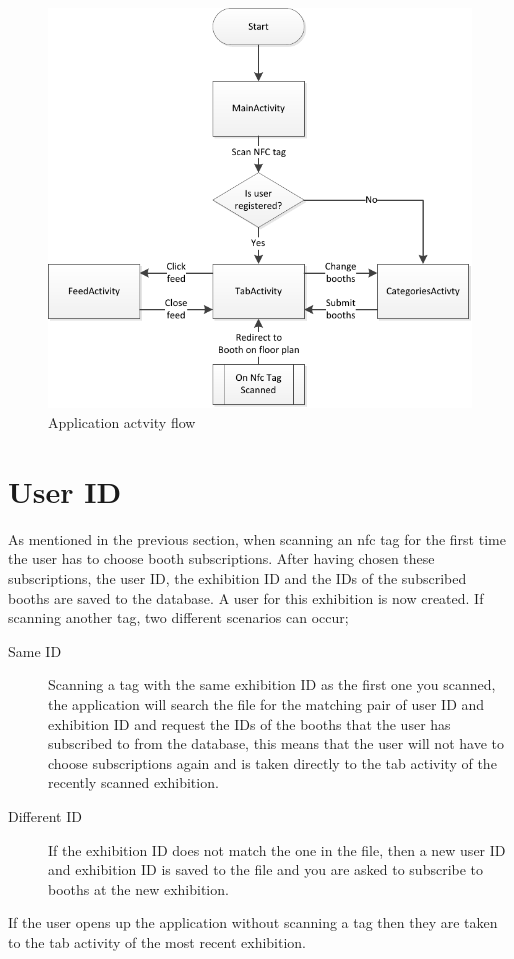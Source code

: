 \begin{figure}[H]
\centering
\includegraphics[width=\columnwidth]{img/appFlowchart.pdf}
\caption{Application actvity flow}
\label{fig:flowchart}
\end{figure}

\section{User ID}
As mentioned in the previous section, when scanning an \ac{nfc} tag for the first time the user has to choose booth subscriptions. After having chosen these subscriptions, the user ID, the exhibition ID and the IDs of the subscribed booths are saved to the database. A user for this exhibition is now created. If scanning another tag, two different scenarios can occur;
\begin{description}
\item[Same ID] Scanning a tag with the same exhibition ID as the first one you scanned, the application will search the file for the matching pair of user ID and exhibition ID and request the IDs of the booths that the user has subscribed to from the database, this means that the user will not have to choose subscriptions again and is taken directly to the tab activity of the recently scanned exhibition. 
\item[Different ID] If the exhibition ID does not match the one in the file, then a new user ID and exhibition ID is saved to the file and you are asked to subscribe to booths at the new exhibition. 
\end{description}
If the user opens up the application without scanning a tag then they are taken to the tab activity of the most recent exhibition. 

